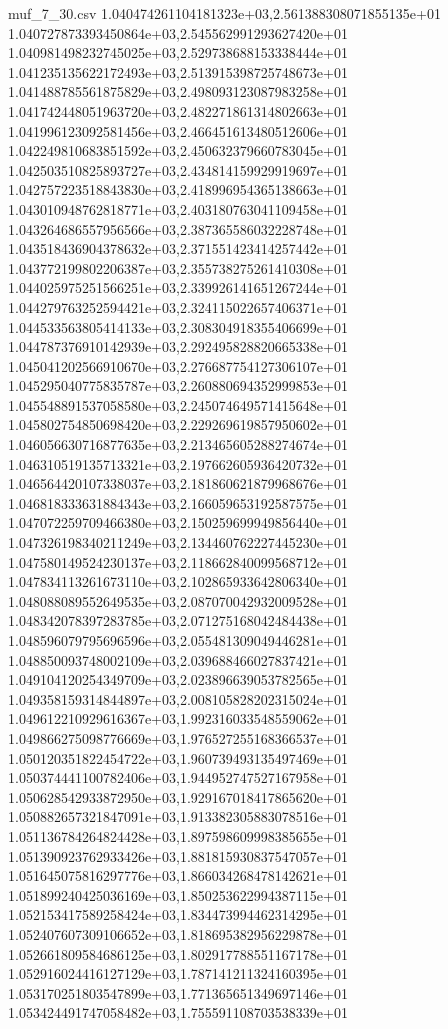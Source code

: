 \begin{filecontents*}{muf_7_30.csv}
1.040474261104181323e+03,2.561388308071855135e+01
1.040727873393450864e+03,2.545562991293627420e+01
1.040981498232745025e+03,2.529738688153338444e+01
1.041235135622172493e+03,2.513915398725748673e+01
1.041488785561875829e+03,2.498093123087983258e+01
1.041742448051963720e+03,2.482271861314802663e+01
1.041996123092581456e+03,2.466451613480512606e+01
1.042249810683851592e+03,2.450632379660783045e+01
1.042503510825893727e+03,2.434814159929919697e+01
1.042757223518843830e+03,2.418996954365138663e+01
1.043010948762818771e+03,2.403180763041109458e+01
1.043264686557956566e+03,2.387365586032228748e+01
1.043518436904378632e+03,2.371551423414257442e+01
1.043772199802206387e+03,2.355738275261410308e+01
1.044025975251566251e+03,2.339926141651267244e+01
1.044279763252594421e+03,2.324115022657406371e+01
1.044533563805414133e+03,2.308304918355406699e+01
1.044787376910142939e+03,2.292495828820665338e+01
1.045041202566910670e+03,2.276687754127306107e+01
1.045295040775835787e+03,2.260880694352999853e+01
1.045548891537058580e+03,2.245074649571415648e+01
1.045802754850698420e+03,2.229269619857950602e+01
1.046056630716877635e+03,2.213465605288274674e+01
1.046310519135713321e+03,2.197662605936420732e+01
1.046564420107338037e+03,2.181860621879968676e+01
1.046818333631884343e+03,2.166059653192587575e+01
1.047072259709466380e+03,2.150259699949856440e+01
1.047326198340211249e+03,2.134460762227445230e+01
1.047580149524230137e+03,2.118662840099568712e+01
1.047834113261673110e+03,2.102865933642806340e+01
1.048088089552649535e+03,2.087070042932009528e+01
1.048342078397283785e+03,2.071275168042484438e+01
1.048596079795696596e+03,2.055481309049446281e+01
1.048850093748002109e+03,2.039688466027837421e+01
1.049104120254349709e+03,2.023896639053782565e+01
1.049358159314844897e+03,2.008105828202315024e+01
1.049612210929616367e+03,1.992316033548559062e+01
1.049866275098776669e+03,1.976527255168366537e+01
1.050120351822454722e+03,1.960739493135497469e+01
1.050374441100782406e+03,1.944952747527167958e+01
1.050628542933872950e+03,1.929167018417865620e+01
1.050882657321847091e+03,1.913382305883078516e+01
1.051136784264824428e+03,1.897598609998385655e+01
1.051390923762933426e+03,1.881815930837547057e+01
1.051645075816297776e+03,1.866034268478142621e+01
1.051899240425036169e+03,1.850253622994387115e+01
1.052153417589258424e+03,1.834473994462314295e+01
1.052407607309106652e+03,1.818695382956229878e+01
1.052661809584686125e+03,1.802917788551167178e+01
1.052916024416127129e+03,1.787141211324160395e+01
1.053170251803547899e+03,1.771365651349697146e+01
1.053424491747058482e+03,1.755591108703538339e+01

\end{filecontents*}
